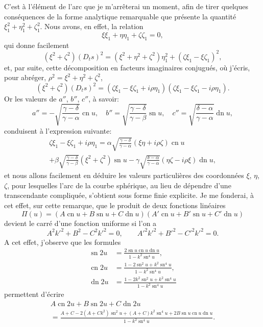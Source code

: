 \documentclass[11pt,leqno,oneside,letterpaper]{book}[2005/09/16]
\DeclareMathOperator{\sn}{sn}
\DeclareMathOperator{\cn}{cn}
\DeclareMathOperator{\dn}{dn}
\begin{document}
C'est \`a l'\'el\'ement de l'arc que je m'arr\^eterai un moment, afin de tirer
quelques cons\'equences de la forme analytique remarquable que pr\'esente
la quantit\'e $\xi_1^2 + \eta_1^2 + \zeta_1^2$. Nous avons, en effet, la relation
\[
  \xi\xi_1 + \eta\eta_1 + \zeta\zeta_1 = 0,
\]
qui donne facilement
\[
  (\xi^2 + \zeta^2) (D_t s)^2
= (\xi^2 + \eta^2 + \zeta^2)\eta_1^2 + (\zeta\xi_1 - \xi\zeta_1)^2,
\]
et, par suite, cette d\'ecomposition en facteurs imaginaires conjugu\'es, o\`u
j'\'ecris, pour abr\'eger, $\rho^2 = \xi^2 + \eta^2 + \zeta^2$,
\[
  (\xi^2 + \zeta^2) (D_t s)^2
= (\zeta\xi_1 - \xi\zeta_1 + i\rho\eta_1)
  (\zeta\xi_1 - \xi\zeta_1 - i\rho\eta_1) .
\]
Or les valeurs de $a''$, $b''$, $c''$, \`a savoir:
\[
  a'' = -\sqrt{\frac{\gamma-\delta}{\gamma-\alpha}} \cn u,  \quad
  b'' =  \sqrt{\frac{\gamma-\delta}{\gamma-\beta }} \sn u,  \quad
  c'' =  \sqrt{\frac{\delta-\alpha}{\gamma-\alpha}} \dn u,
\]
conduisent \`a l'expression suivante:
\begin{multline*}
  \zeta\xi_1 - \xi\zeta_1 + i\rho\eta_1
= \alpha\sqrt{\frac{\gamma-\delta}{\gamma-\alpha}}
   (\xi\eta + i\rho\zeta) \cn u \\
+ \beta \sqrt{\frac{\gamma-\delta}{\gamma-\beta }}
   (\xi^2 + \zeta^2)      \sn u
- \gamma\sqrt{\frac{\delta-\alpha}{\gamma-\alpha}}
   (\eta\zeta - i\rho\xi) \dn u,
\end{multline*}
et nous allons facilement en d\'eduire les valeurs particuli\`eres des coordonn\'ees
$\xi$, $\eta$, $\zeta$, pour lesquelles l'arc de la courbe sph\'erique, au lieu de d\'ependre
d'une transcendante compliqu\'ee, s'obtient sous forme finie explicite.
Je me fonderai, \`a cet effet, sur cette remarque, que le produit de deux
fonctions lin\'eaires
\[
  \Pi(u) = (A\cn u + B\sn u + C\dn u) (A'\cn u + B'\sn u + C'\dn u)
\]
devient le carr\'e d'une fonction uniforme si l'on a
\[
  A^2 k'^2 + B^2  - C^2 k'^2 = 0, \qquad
  A'^2k'^2 + B'^2 - C'^2k'^2 = 0.
\]
A cet effet, j'observe que les formules
\begin{align*}
  \sn 2u &= \frac{2\sn u \cn u \dn u          }{1 - k^2\sn^4 u},  \\
  \cn 2u &= \frac{1 - 2   \sn^2 u + k^2\sn^4 u}{1 - k^2\sn^4 u},  \\
  \dn 2u &= \frac{1 - 2k^2\sn^2 u + k^2\sn^4 u}{1 - k^2\sn^4 u}
\end{align*}
permettent d'\'ecrire
\begin{multline*}
  A\cn 2u + B\sn 2u + C\dn 2u  \\
= \frac{A+C - 2(A+Ck^2)\sn^2 u +
    (A+C)k^2\sn^4 u + 2B\sn u\cn u\dn u}{1 - k^2\sn^4 u}.
\end{multline*}
\end{document}
